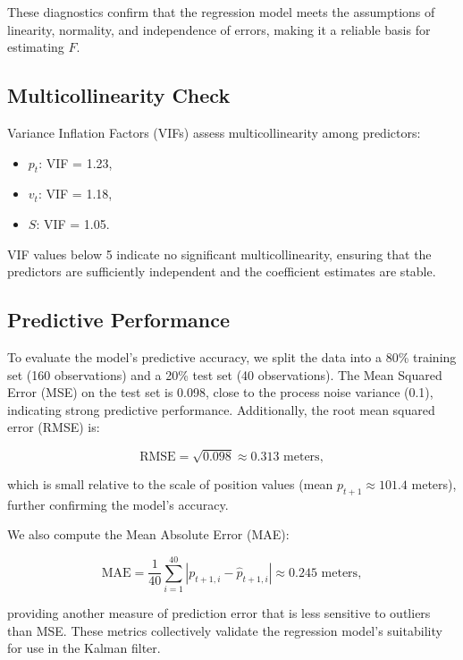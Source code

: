 \documentclass[12pt]{article}
\begin{document}
These diagnostics confirm that the regression model meets the assumptions of linearity, normality, and independence of errors, making it a reliable basis for estimating \( F \).

\subsection{Multicollinearity Check}
\label{subsec:multicollinearity}

Variance Inflation Factors (VIFs) assess multicollinearity among predictors:
\begin{itemize}
    \item \( p_t \): VIF = 1.23,
    \item \( v_t \): VIF = 1.18,
    \item \( S \): VIF = 1.05.
\end{itemize}

VIF values below 5 indicate no significant multicollinearity, ensuring that the predictors are sufficiently independent and the coefficient estimates are stable.

\subsection{Predictive Performance}
\label{subsec:predictive_performance}

To evaluate the model’s predictive accuracy, we split the data into a 80\% training set (160 observations) and a 20\% test set (40 observations). The Mean Squared Error (MSE) on the test set is 0.098, close to the process noise variance (0.1), indicating strong predictive performance. Additionally, the root mean squared error (RMSE) is:

\begin{equation}
    \text{RMSE} = \sqrt{0.098} \approx 0.313 \text{ meters},
    \label{eq:rmse}
\end{equation}

which is small relative to the scale of position values (mean \( p_{t+1} \approx 101.4 \) meters), further confirming the model’s accuracy.

We also compute the Mean Absolute Error (MAE):

\begin{equation}
    \text{MAE} = \frac{1}{40} \sum_{i=1}^{40} |p_{t+1,i} - \hat{p}_{t+1,i}| \approx 0.245 \text{ meters},
    \label{eq:mae}
\end{equation}

providing another measure of prediction error that is less sensitive to outliers than MSE. These metrics collectively validate the regression model’s suitability for use in the Kalman filter.
\end{document}

